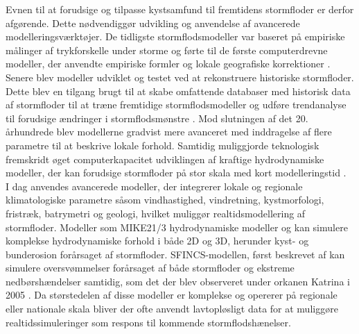 Evnen til at forudsige og tilpasse kystsamfund til fremtidens stormfloder er derfor afgørende. Dette nødvendiggør udvikling og anvendelse af avancerede modelleringsværktøjer. De tidligste stormflodsmodeller var baseret på empiriske målinger af trykforskelle under storme og førte til de første computerdrevne modeller, der anvendte empiriske formler og lokale geografiske korrektioner \citep{massey_history_2007}. Senere blev modeller udviklet og testet ved at rekonstruere historiske stormfloder. Dette blev en tilgang brugt til at skabe omfattende databaser med historisk data af stormfloder til at træne fremtidige stormflodsmodeller og udføre trendanalyse til forudsige ændringer i stormflodsmønstre \citep{tadesse_database_2021, dang_dataset_2024}. Mod slutningen af det 20. århundrede blev modellerne gradvist mere avanceret med inddragelse af flere parametre til at beskrive lokale forhold. Samtidig muliggjorde teknologisk fremskridt øget computerkapacitet udviklingen af kraftige hydrodynamiske modeller, der kan forudsige stormfloder på stor skala med kort modelleringstid \citep{tadesse_database_2021, massey_history_2007}.\\
I dag anvendes avancerede modeller, der integrerer lokale og regionale klimatologiske parametre såsom vindhastighed, vindretning, kystmorfologi, fristræk, batrymetri og geologi, hvilket muliggør realtidsmodellering af stormfloder. Modeller som MIKE21/3 hydrodynamiske modeller \citep{dhi_mike_2024} og \cite{adcirc_introduction_nodate} kan simulere komplekse hydrodynamiske forhold i både 2D og 3D, herunder kyst- og bunderosion forårsaget af stormfloder. SFINCS-modellen, først beskrevet af \cite{leijnse_modeling_2021} kan simulere oversvømmelser forårsaget af både stormfloder og ekstreme nedbørshændelser samtidig, som det der blev observeret under orkanen Katrina i 2005 \citep{reible_hurricane_2007}. Da størstedelen af disse modeller er komplekse og opererer på regionale eller nationale skala bliver der ofte anvendt lavtopløsligt data for at muliggøre realtidssimuleringer som respons til kommende stormflodshænelser.\\

